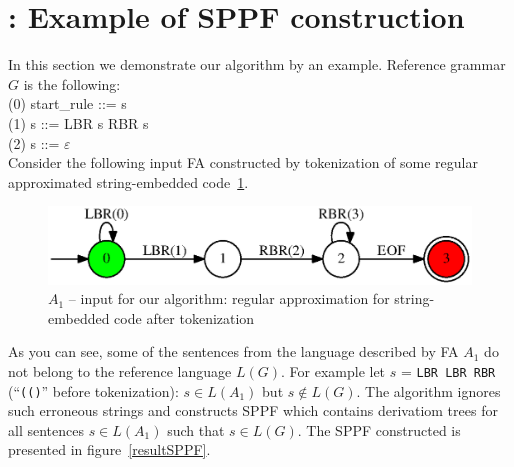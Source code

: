 \appendix

\section{\appendixname: Example of SPPF construction}\label{example}

In this section we demonstrate our algorithm by an example. Reference grammar $G$ is the following:\\
(0) start\_rule ::= s \\
(1) s ::= LBR s RBR s\\
(2) s ::= $\varepsilon$ \\

Consider the following input FA constructed by tokenization of some regular approximated string-embedded code~\ref{faApprox}.

\begin{figure}
    \begin{center}
        \includegraphics[scale=0.5]{dot/in3.eps}
    \end{center}
    \caption{$A_1$ -- input for our algorithm: regular approximation for string-embedded code after tokenization} 
    \label{faApprox}
\end{figure}

As you can see, some of the sentences from the language described by FA $A_1$ do not belong to the reference language $L(G)$.
For example let $s$ = \verb|LBR LBR RBR| (``\verb|(()|'' before tokenization): $s \in L(A_1)$ but $s \notin L(G)$.
The algorithm ignores such erroneous strings and constructs SPPF which contains derivatiom trees for all sentences $s \in L(A_1)$ such that $s \in L(G)$.
The SPPF constructed is presented in figure~\ref{resultSPPF}.

